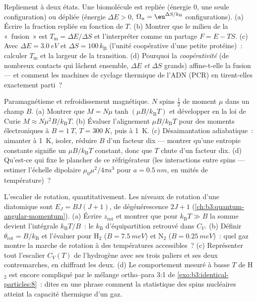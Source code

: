 \begin{exercise}[$\star\star\star$]\label{exo:b3:canonical-ensemble:10}
Repliement à deux états. Une biomolécule est repliée (énergie $0$, une
seule configuration) ou dépliée (énergie $\Delta E > 0$, $\Omega_u =
\eu^{\Delta S/k_{\text{B}}}$ configurations). (a) Écrire la fraction
repliée en fonction de $T$. (b) Montrer que le milieu de la «~fusion~»
est $T_{\text{m}} = \Delta E/\Delta S$ et l'interpréter comme un
partage $F = E -
TS$. (c) Avec $\Delta E = \qty{3.0}{eV}$ et $\Delta S =
100\,k_{\text{B}}$ (l'unité coopérative d'une petite protéine)~:
calculer $T_{\text{m}}$ et la largeur de la transition. (d) Pourquoi
la \emph{coopérativité} (de nombreux contacts qui lâchent ensemble,
$\Delta E$ \emph{et} $\Delta S$ grands) affine-t-elle la fusion ---
et comment les machines de cyclage thermique de l'ADN (PCR) en
tirent-elles exactement parti~?
\end{exercise}

\begin{exercise}[$\star\star\star$]\label{exo:b3:canonical-ensemble:11}
Paramagnétisme et refroidissement magnétique. $N$ spins $\tfrac12$ de
moment $\mu$ dans un champ $B$. (a) Montrer que
$M = N\mu\tanh(\mu B/k_{\text{B}}T)$ et développer en la loi de Curie
$M \approx N\mu^2B/k_{\text{B}}T$. (b) Évaluer l'alignement
$\mu B/k_{\text{B}}T$ pour des moments électroniques à
$B = \qty{1}{T}$, $T = \qty{300}{K}$, puis à \qty{1}{K}. (c)
Désaimantation adiabatique~: aimanter à \qty{1}{K}, isoler, réduire
$B$ d'un facteur dix --- montrer qu'une entropie constante signifie un
$\mu B/k_{\text{B}}T$ constant, donc que $T$ chute d'un facteur dix.
(d) Qu'est-ce qui fixe le plancher de ce réfrigérateur (les
interactions entre spins --- estimer l'échelle dipolaire
$\mu_0\mu^2/4\pi a^3$ pour $a =
\qty{0.5}{nm}$, en unités de température)~?
\end{exercise}

\begin{exercise}[$\star\star\star$]\label{exo:b3:canonical-ensemble:12}
L'escalier de rotation, quantitativement. Les niveaux de rotation
d'une diatomique sont $E_J = BJ(J+1)$, de dégénérescence $2J + 1$
(\cref{ch:b3:quantum-angular-momentum}). (a) Écrire $z_{\text{rot}}$
et montrer que pour $k_{\text{B}}T \gg B$ la somme devient
l'intégrale $k_{\text{B}}T/B$~: le $k_{\text{B}}$ d'équipartition
retrouvé dans $C_V$. (b) Définir $\theta_{\text{rot}} =
B/k_{\text{B}}$ et l'évaluer pour H$_2$ ($B = \qty{7.5}{meV}$) et
N$_2$ ($B = \qty{0.25}{meV}$)~: quel gaz montre la marche de rotation
à des températures accessibles~? (c) Représenter tout l'escalier
$C_V(T)$ de l'hydrogène avec ses trois paliers et ses deux
contremarches, en chiffrant les deux. (d) Le comportement mesuré à
basse $T$ de H$_2$ est encore compliqué par le mélange ortho--para 3:1
de \cref{exo:b3:identical-particles:8}~: dites en une phrase comment
la statistique des spins nucléaires atteint la capacité thermique d'un
gaz.
\end{exercise}

